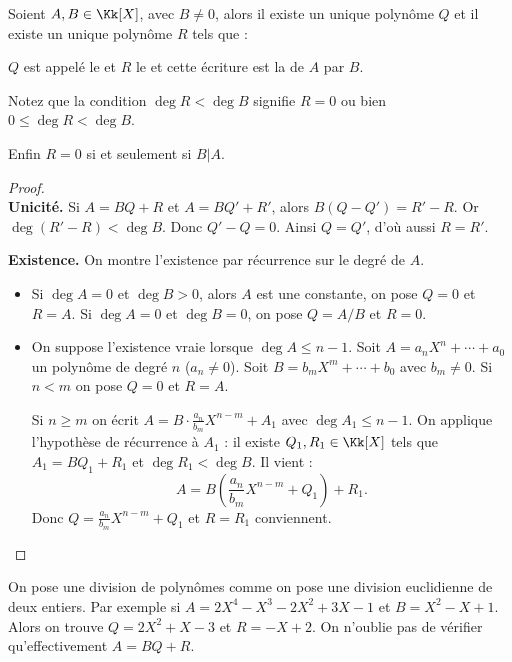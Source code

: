 \documentclass[class=report,crop=false]{standalone}
\begin{document}
\begin{theoreme}
Soient $A,B \in\Kk[X]$, avec $B \neq 0$, alors il existe un
unique polynôme $Q$ et il existe un unique polynôme $R$ tels que :
\end{theoreme}

$Q$ est appelé le  et $R$ le  et cette écriture
est la  de $A$ par $B$.

Notez que la condition $\deg R < \deg B$ signifie $R=0$
ou bien $0 \le \deg R < \deg B$.

Enfin $R=0$ si et seulement si $B|A$.

\begin{proof}
~\\
\textbf{Unicité.}
 Si $A=BQ+R$ et $A=BQ'+R'$, alors $B(Q-Q')=R'-R$. Or $\deg(R'-R) < \deg B$.
Donc $Q'-Q=0$. Ainsi $Q=Q'$, d'où aussi $R=R'$.


\textbf{Existence.}
On montre l'existence par récurrence sur le degré de $A$.
\begin{itemize}
  \item Si $\deg A=0$ et $\deg B>0$, alors $A$ est une constante, on pose $Q=0$ et $R=A$.
  Si $\deg A=0$ et $\deg B=0$, on pose $Q=A/B$ et $R=0$.
  \item On suppose l'existence vraie lorsque $\deg A \le n-1$.
Soit $A=a_nX^n+\cdots+a_0$ un polynôme de degré $n$ ($a_n \neq 0$).
Soit $B =b_mX^m+\cdots+b_0$ avec $b_m \neq 0$.
Si $n<m$ on pose $Q=0$ et $R=A$.

Si $n \ge m$ on écrit $A=B \cdot \frac{a_n}{b_m}X^{n-m} + A_1$
avec $\deg A_1 \le n-1$. On applique l'hypothèse de récurrence à $A_1$ :
il existe $Q_1,R_1 \in \Kk[X]$ tels que $A_1=BQ_1+R_1$ et $\deg R_1 < \deg B$.
Il vient :
$$A= B \left( \frac{a_n}{b_m}X^{n-m} + Q_1 \right) + R_1.$$
Donc $Q=\frac{a_n}{b_m}X^{n-m} + Q_1$ et $R=R_1$ conviennent.
\end{itemize}
\end{proof}



\begin{exemple}
On pose une division de polynômes comme on pose une division euclidienne de deux entiers.
Par exemple si $A=2X^4-X^3-2X^2+3X-1$ et $B=X^2-X+1$.
Alors on trouve $Q= 2X^2+X-3$ et $R=-X+2$.
On n'oublie pas de vérifier qu'effectivement $A=BQ+R$.


\end{exemple}
\end{document}

